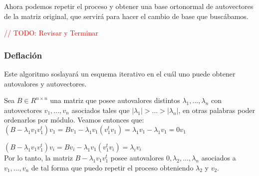 Ahora podemos repetir el proceso y obtener una base ortonormal de autovectores de la matriz original, que servir\'a para hacer el cambio de base que busc\'abamos.

\textcolor{red}{// TODO: Revisar y Terminar}

\subsubsection{Deflaci\'on}\label{desarrollo_deflacion}

Este algoritmo soslayar\'a un esquema iterativo en el cu\'al uno puede obtener autovalores y autovectores.

Sea $B \in R^{n \times n}$ una matriz que posee autovalores distintos $\lambda_{1}, ..., \lambda_{n}$ con autovectores $v_{1}, ..., v_{n}$ asociados tales que $\vert \lambda_{1} \vert > ... > \vert \lambda_{n} \vert$, en otras palabras poder ordenarlos por m\'odulo. Veamos entonces que: \\

$(B - \lambda_{1}v_{1}v_{1}^{t})v_{1} = Bv_{1} - \lambda_{1}v_{1}(v_{1}^{t}v_{1}) = \lambda_{1}v_{1} - \lambda_{1}v_{1} = 0v_{1}$

$(B - \lambda_{1}v_{1}v_{1}^{t})v_{i} = Bv_{i} - \lambda_{1}v_{1}(v_{1}^{t}v_{i}) = \lambda_{i}v_{i}$ \\

Por lo tanto, la matriz $B - \lambda_{1}v_{1}v_{1}^{t}$ posee autovalores $0, \lambda_{2}, ..., \lambda_{n}$ asociados a $v_{1}, ..., v_{n}$ de tal forma que puedo repetir el proceso obteniendo $\lambda_{2}$ y $v_{2}$.